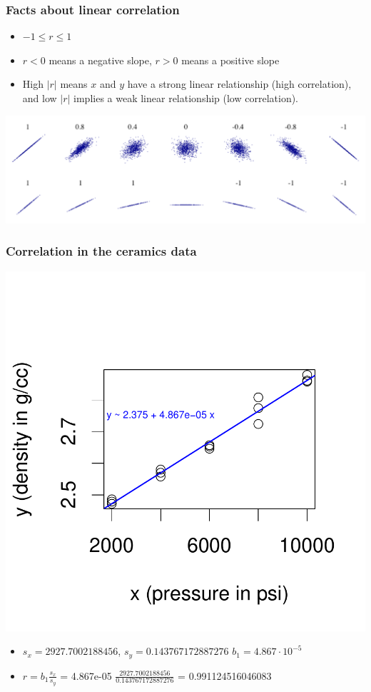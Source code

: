 \documentclass[handout]{beamer}
\numberwithin{equation}{section}
\begin{document}
\begin{frame}
\frametitle{Facts about linear correlation}
\begin{itemize}
\pause \item $-1 \le r \le 1$
\pause \item $r < 0$ means a negative slope, $r > 0$ means a positive slope
\pause \item High $|r|$ means $x$ and $y$ have a strong linear relationship (high correlation), and low $|r|$ implies a weak linear relationship (low correlation).
\end{itemize}

 \includegraphics{../../fig/diffcorrs.png}
\end{frame}

\begin{frame}
\frametitle{Correlation in the ceramics data}
\vspace{-5em}
\begin{center}
\includegraphics{ch4part1-009}
\end{center}
\vspace{-2em}
\begin{itemize}
\pause \item $s_x = 2927.7002188456$, $s_y= 0.143767172887276$  $b_1 = 4.867 \cdot 10^{-5}$
\pause \item $r = b_1 \frac{s_x}{s_y} $  = 4.867e-05 $\frac{2927.7002188456}{0.143767172887276}$ = 0.991124516046083
\end{itemize}

\end{frame}
\end{document}

